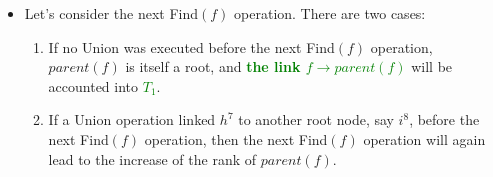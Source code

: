 \documentclass[mathserif]{beamer}
\begin{document}
{\begin{itemize}
%  
% 
%     
%        
% 
%   

	
	\item Let's consider the next {\sc Find}$(f)$ operation. There are two cases:  
		\begin{enumerate}
			\item If no {\sc Union} was executed before the next  {\sc Find}$(f)$ operation, $parent(f)$ is itself a root, and \textcolor{green}{\bf the link $f\rightarrow parent(f)$} will be accounted into \textcolor{green}{\bf $T_1$}. 	
			\item 
			If a {\sc Union} operation linked $h^{7}$ to another root node, say $i^{8}$, before the next {\sc Find}$(f)$ operation,  then the next {\sc Find}$(f)$ operation will again lead to the increase of the rank of $parent(f)$. 
		\end{enumerate}
\end{itemize} 
}
\end{document}

